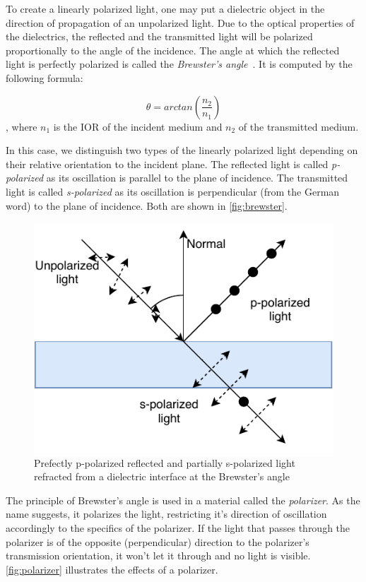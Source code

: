 To create a linearly polarized light, one may put a dielectric object in the direction of propagation of an unpolarized light. Due to the optical properties of the dielectrics, the reflected and the transmitted light will be polarized proportionally to the angle of the incidence. The angle at which the reflected light is perfectly polarized is called the \emph{Brewster's angle}~\cite{brewster1815laws}. It is computed by the following formula:

\begin{equation}
\theta=arctan(\frac{n_2}{n_1})
\end{equation}
, where $n_1$ is the IOR of the incident medium and $n_2$ of the transmitted medium.

In this case, we distinguish two types of the linearly polarized light depending on their relative orientation to the incident plane. The reflected light is called \emph{p-polarized} as its oscillation is parallel to the plane of incidence. The transmitted light is called \emph{s-polarized} as its oscillation is perpendicular (from the German word) to the plane of incidence. Both are shown in \autoref{fig:brewster}.

\begin{figure}[h]
	\centering
	\includegraphics[width=.7\linewidth]{img/brewster.pdf}
	\caption{Prefectly p-polarized reflected and partially s-polarized light refracted from a dielectric interface at the Brewster's angle}
	\label{fig:brewster}
\end{figure}


The principle of Brewster's angle is used in a material called the \emph{polarizer}. As the name suggests, it polarizes the light, restricting it's direction of oscillation accordingly to the specifics of the polarizer. If the light that passes through the polarizer is of the opposite (perpendicular) direction to the polarizer's transmission orientation, it won't let it through and no light is visible. \autoref{fig:polarizer} illustrates the effects of a polarizer.

